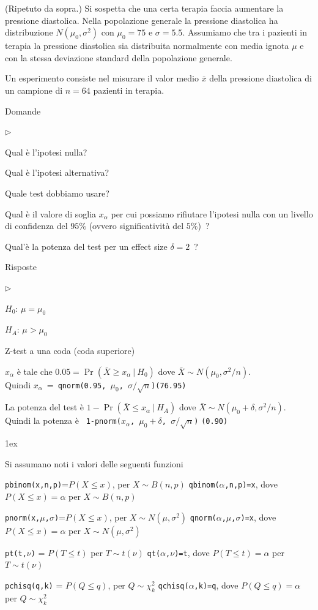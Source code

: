 \documentclass[11pt,openany]{book}
\newcommand{\mylabel}[1]{{\footnotesize\textsf{#1}}\hfill}
\renewenvironment{itemize}
  {\begin{list}{$\triangleright$}{%
   \setlength{\parskip}{0mm}
   \setlength{\topsep}{.2\baselineskip}
   \setlength{\rightmargin}{0mm}
   \setlength{\listparindent}{0mm}
   \setlength{\itemindent}{0mm}
   \setlength{\labelwidth}{3ex}
   \setlength{\itemsep}{.4\baselineskip}
   \setlength{\parsep}{0mm}
   \setlength{\partopsep}{0mm}
   \setlength{\labelsep}{1ex}
   \setlength{\leftmargin}{\labelwidth+\labelsep}
   \let\makelabel\mylabel}}{%
   \end{list}\vspace*{-1.3mm}}
\begin{document}
(Ripetuto da sopra.) Si sospetta che una certa terapia faccia aumentare la pressione diastolica. Nella popolazione generale la pressione diastolica ha distribuzione $N(\mu_0,\sigma^2)$ con $\mu_0=75$ e $\sigma=5.5$. Assumiamo che tra i pazienti in terapia la pressione diastolica sia distribuita normalmente con media ignota $\mu$ e con la stessa deviazione standard della popolazione generale. 

Un esperimento consiste nel misurare il valor medio $\bar x$ della pressione diastolica di un campione di $n=64$ pazienti in terapia.

Domande

\begin{itemize}
\item[1.] Qual è l'ipotesi nulla?
\item[2.] Qual è l'ipotesi alternativa?
\item[3.] Quale test dobbiamo usare?
\item[4.] Qual è il valore di soglia $x_\alpha$ per cui possiamo rifiutare l'ipotesi nulla con un livello di confidenza del $95\%$ (ovvero significatività del $5\%$)~?
\item[5.] Qual'è la potenza del test per un effect size $\delta=2$~? 
\end{itemize}

Risposte

\begin{itemize}
\item[1.] $H_0$: $\mu=\mu_0$
\item[2.] $H_A$: $\mu>\mu_0$
\item[3.] Z-test a una coda (coda superiore)
\item[4.] $x_\alpha$ è tale che $0.05=\Pr(\bar X\ge x_\alpha\ |\ H_0)$ dove $\bar X\sim N(\mu_0,\sigma^2/n)$.\\
Quindi $x_\alpha\ =\ ${\tt qnorm(0.95, $\mu_0$, $\sigma/\sqrt{n}$)\hfill(76.95)}
\item[5.] La potenza del test è $1-\Pr(\bar X\le x_\alpha\ |\ H_A)$ dove $\bar X\sim N(\mu_0+\delta,\sigma^2/n)$.\\
Quindi la potenza è \ {\tt 1-pnorm($x_\alpha$, $\mu_0+\delta$, $\sigma/\sqrt{n}$)} \hfill{\tt(0.90)}
\end{itemize}


\parskip1ex
{\hrulefill\scriptsize

Si assumano noti i valori delle seguenti funzioni

{\tt pbinom(x,n,p)}=$P(X\le x)$, per $X\sim B(n,p)$
\hfill 
{\tt qbinom($\alpha$,n,p)=x},  dove $P(X\le x)=\alpha$ per $X\sim B(n,p)$

{\tt pnorm(x,$\mu$,$\sigma$)}=$P(X\le x)$, per $X\sim N(\mu,\sigma^2)$
\hfill 
{\tt qnorm($\alpha$,$\mu$,$\sigma$)=x},  dove $P(X\le x)=\alpha$ per $X\sim N(\mu,\sigma^2)$

{\tt pt(t,$\nu$)} = $P(T\le t)$ per $T\sim t(\nu)$
\hfill
{\tt qt($\alpha$,$\nu$)=t}, dove $P(T\le t)=\alpha$ per $T\sim t(\nu)$

{\tt pchisq(q,k)} = $P(Q\le q)$, per $Q\sim \chi^2_k$
\hfill
{\tt qchisq($\alpha$,k)=q},  dove $P(Q\le q)=\alpha$ per $Q\sim \chi^2_k$
\par
}
\end{document}

